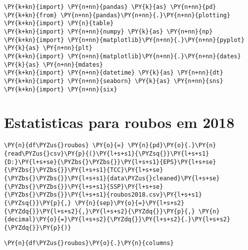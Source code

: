 \begin{tcolorbox}[breakable, size=fbox, boxrule=1pt, pad at break*=1mm,colback=cellbackground, colframe=cellborder]
\begin{Verbatim}[commandchars=\\\{\}]
\PY{k+kn}{import} \PY{n+nn}{pandas} \PY{k}{as} \PY{n+nn}{pd}
\PY{k+kn}{from} \PY{n+nn}{pandas}\PY{n+nn}{.}\PY{n+nn}{plotting} \PY{k+kn}{import} \PY{n}{table}
\PY{k+kn}{import} \PY{n+nn}{numpy} \PY{k}{as} \PY{n+nn}{np}
\PY{k+kn}{import} \PY{n+nn}{matplotlib}\PY{n+nn}{.}\PY{n+nn}{pyplot} \PY{k}{as} \PY{n+nn}{plt}
\PY{k+kn}{import} \PY{n+nn}{matplotlib}\PY{n+nn}{.}\PY{n+nn}{dates} \PY{k}{as} \PY{n+nn}{mdates}
\PY{k+kn}{import} \PY{n+nn}{datetime} \PY{k}{as} \PY{n+nn}{dt}
\PY{k+kn}{import} \PY{n+nn}{seaborn} \PY{k}{as} \PY{n+nn}{sns}
\PY{k+kn}{import} \PY{n+nn}{six}
\end{Verbatim}
\end{tcolorbox}

    \hypertarget{estatisticas-para-roubos-em-2018}{%
\section*{Estatisticas para roubos em
2018}\label{estatisticas-para-roubos-em-2018}}

    \begin{tcolorbox}[breakable, size=fbox, boxrule=1pt, pad at break*=1mm,colback=cellbackground, colframe=cellborder]
\begin{Verbatim}[commandchars=\\\{\}]
\PY{n}{df\PYZus{}roubos} \PY{o}{=} \PY{n}{pd}\PY{o}{.}\PY{n}{read\PYZus{}csv}\PY{p}{(}\PY{l+s+s1}{\PYZsq{}}\PY{l+s+s1}{D:}\PY{l+s+se}{\PYZbs{}\PYZbs{}}\PY{l+s+s1}{EPS}\PY{l+s+se}{\PYZbs{}\PYZbs{}}\PY{l+s+s1}{TCC}\PY{l+s+se}{\PYZbs{}\PYZbs{}}\PY{l+s+s1}{data\PYZus{}cleaned}\PY{l+s+se}{\PYZbs{}\PYZbs{}}\PY{l+s+s1}{SSP}\PY{l+s+se}{\PYZbs{}\PYZbs{}}\PY{l+s+s1}{roubos2018.csv}\PY{l+s+s1}{\PYZsq{}}\PY{p}{,} \PY{n}{sep}\PY{o}{=}\PY{l+s+s2}{\PYZdq{}}\PY{l+s+s2}{,}\PY{l+s+s2}{\PYZdq{}}\PY{p}{,} \PY{n}{decimal}\PY{o}{=}\PY{l+s+s2}{\PYZdq{}}\PY{l+s+s2}{.}\PY{l+s+s2}{\PYZdq{}}\PY{p}{)}
\end{Verbatim}
\end{tcolorbox}

    \begin{tcolorbox}[breakable, size=fbox, boxrule=1pt, pad at break*=1mm,colback=cellbackground, colframe=cellborder]
\begin{Verbatim}[commandchars=\\\{\}]
\PY{n}{df\PYZus{}roubos}\PY{o}{.}\PY{n}{columns}
\end{Verbatim}
\end{tcolorbox}


